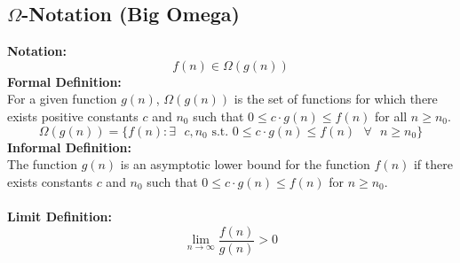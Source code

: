 \subsection{$\Omega$-Notation (Big Omega)}
\textbf{Notation:}
$$
f(n) \in \Omega(g(n))
$$
\textbf{Formal Definition:}\\
For a given function $g(n)$, $\Omega(g(n))$ is the set of functions for which there exists positive constants $c$ and $n_0$ such that $0 \leq c \cdot g(n) \leq f(n)$ for all $n \geq n_0$.
$$
\Omega(g(n)) = \{ f(n) : \exists \text{ } c, n_0 \text{ s.t. } 0 \leq c \cdot g(n) \leq f(n) \text{ } \forall \text{ } n \geq n_0 \}
$$
\textbf{Informal Definition:}\\
The function $g(n)$ is an asymptotic lower bound for the function $f(n)$ if there exists constants $c$ and $n_0$ such that $0 \leq c \cdot g(n) \leq f(n)$ for $n \geq n_0$.\\\\
\textbf{Limit Definition:}
$$
\lim\limits_{n \to \infty} \frac{f(n)}{g(n)} > 0
$$